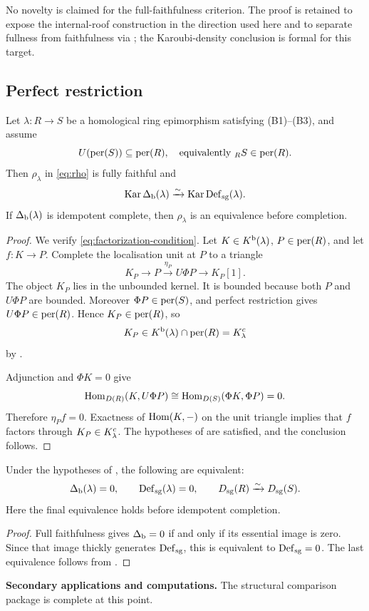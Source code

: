 \begin{remark}
No novelty is claimed for the full-faithfulness criterion.  The proof is retained to expose the internal-roof construction in the direction used here and to separate fullness from faithfulness via ; the Karoubi-density conclusion is formal for this target.
\end{remark}

\subsection{Perfect restriction}

\begin{theorem}\label{thm:perfect-restriction}
Let \(\lambda:R\to S\) be a homological ring epimorphism satisfying \textup{(B1)--(B3)}, and assume
\[
 U(\operatorname{per}(S))\subseteq\operatorname{per}(R),
 \quad\text{equivalently }{}_RS\in\operatorname{per}(R).
\]
Then \(\rho_\lambda\) in \eqref{eq:rho} is fully faithful and
\[
 \operatorname{Kar}\Delta_{\mathrm b}(\lambda)
 \xrightarrow{\sim}
 \operatorname{Kar}\operatorname{Def}_{\mathrm{sg}}(\lambda).
\]
If \(\Delta_{\mathrm b}(\lambda)\) is idempotent complete, then \(\rho_\lambda\) is an equivalence before completion.
\end{theorem}

\begin{proof}
We verify \eqref{eq:factorization-condition}.  Let
\(K\in K^{\mathrm b}(\lambda)\), \(P\in\operatorname{per}(R)\), and let \(f:K\to P\).  Complete the localisation unit at \(P\) to a triangle
\[
 K_P\longrightarrow P\xrightarrow{\eta_P}U\Phi P\longrightarrow K_P[1].
\]
The object \(K_P\) lies in the unbounded kernel.  It is bounded because both \(P\) and \(U\Phi P\) are bounded.  Moreover \(\Phi P\in\operatorname{per}(S)\), and perfect restriction gives \(U\Phi P\in\operatorname{per}(R)\).  Hence \(K_P\in\operatorname{per}(R)\), so
\[
 K_P\in K^{\mathrm b}(\lambda)\cap\operatorname{per}(R)=K^c_\lambda
\]
by .

Adjunction and \(\Phi K=0\) give
\[
 \operatorname{Hom}_{D(R)}(K,U\Phi P)
 \cong
 \operatorname{Hom}_{D(S)}(\Phi K,\Phi P)=0.
\]
Therefore \(\eta_Pf=0\).  Exactness of \(\operatorname{Hom}(K,-)\) on the unit triangle implies that \(f\) factors through \(K_P\in K^c_\lambda\).  The hypotheses of  are satisfied, and the conclusion follows.
\end{proof}

\begin{corollary}\label{cor:comparison-vanishing}
Under the hypotheses of , the following are equivalent:
\[
 \Delta_{\mathrm b}(\lambda)=0,
 \qquad
 \operatorname{Def}_{\mathrm{sg}}(\lambda)=0,
 \qquad
 D_{\mathrm{sg}}(R)\xrightarrow{\sim}D_{\mathrm{sg}}(S).
\]
Here the final equivalence holds before idempotent completion.
\end{corollary}

\begin{proof}
Full faithfulness gives \(\Delta_{\mathrm b}=0\) if and only if its essential image is zero.  Since that image thickly generates \(\operatorname{Def}_{\mathrm{sg}}\), this is equivalent to \(\operatorname{Def}_{\mathrm{sg}}=0\).  The last equivalence follows from .
\end{proof}

\medskip
\noindent\textbf{Secondary applications and computations.}
The structural comparison package is complete at this point.  